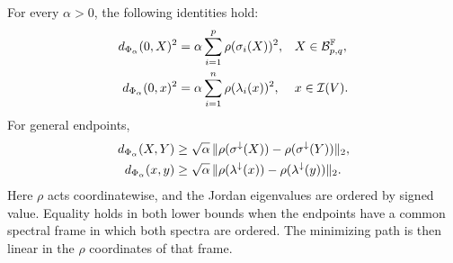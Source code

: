 \begin{theorem}
\label{thm:exact-distance}
For every $\alpha>0$, the following identities hold:
\begin{align}
 d_{\Phi_\alpha}(0,X)^2
   &=\alpha\sum_{i=1}^p\rho(\sigma_i(X))^2,
   &&X\in\mathcal B_{p,q}^{\mathbb F}, \label{eq:matrix-radial-distance}\\
 d_{\Phi_\alpha}(0,x)^2
   &=\alpha\sum_{i=1}^n\rho(\lambda_i(x))^2,
   &&x\in\mathcal I(V). \label{eq:jordan-radial-distance}
\end{align}
For general endpoints,
\begin{align}
 d_{\Phi_\alpha}(X,Y)
 &\geq\sqrt\alpha\,
 \lVert \rho(\sigma^\downarrow(X))-\rho(\sigma^\downarrow(Y))\rVert_2,
 \label{eq:matrix-contraction}\\
 d_{\Phi_\alpha}(x,y)
 &\geq\sqrt\alpha\,
 \lVert \rho(\lambda^\downarrow(x))-\rho(\lambda^\downarrow(y))\rVert_2.
 \label{eq:jordan-contraction}
\end{align}
Here $\rho$ acts coordinatewise, and the Jordan eigenvalues are
ordered by signed value. Equality holds in both lower bounds when the
endpoints have a common spectral frame in which both spectra are
ordered. The minimizing path is then linear in the $\rho$ coordinates
of that frame.
\end{theorem}
